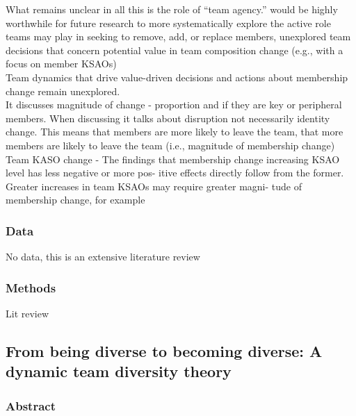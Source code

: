 \documentclass[12pt]{article}
\begin{document}
What remains unclear in all this is the role of “team agency.”  would be highly worthwhile for future research to more systematically explore the active role teams may play in seeking to remove, add, or replace members, unexplored team decisions that concern potential value in team composition change (e.g., with a focus on member KSAOs) \\

Team dynamics that drive value-driven decisions and actions about membership change remain unexplored. \\

It discusses magnitude of change - proportion and if they are key or peripheral members. When discussing it talks about disruption not necessarily identity change. This means that members are more likely to leave the team, that more members are likely to leave the team (i.e., magnitude of membership change) \\

Team KASO change - The findings that membership change increasing KSAO level has less negative or more pos- itive effects directly follow from the former. Greater increases in team KSAOs may require greater magni- tude of membership change, for example


\subsubsection*{Data}

No data, this is an extensive literature review

\subsubsection*{Methods}

Lit review

\subsection*{From being diverse to becoming diverse: A dynamic team diversity theory\cite{diverse_to_becoming_diverse}}

\subsubsection*{Abstract}
\end{document}
